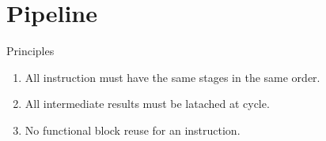 \chapter{Pipeline}
Principles
\begin{enumerate}
    \item All instruction must have the same stages in the same order.
    \item All intermediate results must be latached at cycle.
    \item No functional block reuse for an instruction.
\end{enumerate}